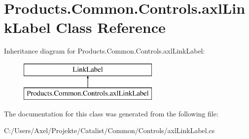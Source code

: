 \hypertarget{class_products_1_1_common_1_1_controls_1_1axl_link_label}{}\section{Products.\+Common.\+Controls.\+axl\+Link\+Label Class Reference}
\label{class_products_1_1_common_1_1_controls_1_1axl_link_label}
Inheritance diagram for Products.\+Common.\+Controls.\+axl\+Link\+Label\+:\begin{figure}[H]
\begin{center}
\leavevmode
\includegraphics[height=2.000000cm]{class_products_1_1_common_1_1_controls_1_1axl_link_label}
\end{center}
\end{figure}


The documentation for this class was generated from the following file\+:\begin{DoxyCompactItemize}
\item 
C\+:/\+Users/\+Axel/\+Projekte/\+Catalist/\+Common/\+Controls/axl\+Link\+Label.\+cs\end{DoxyCompactItemize}
